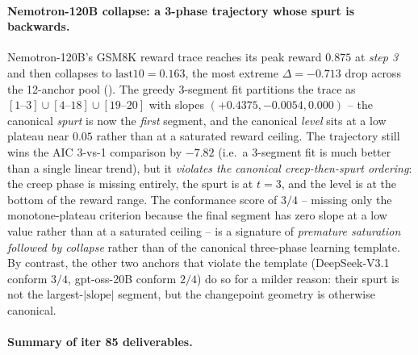 \paragraph{Nemotron-120B collapse: a 3-phase trajectory whose spurt is
backwards.}
\label{par:scaling-iter85-nemotron}
Nemotron-120B's GSM8K reward trace reaches its peak reward $0.875$ at
\emph{step 3} and then collapses to $\mathrm{last10} = 0.163$, the most
extreme $\Delta = -0.713$ drop across the 12-anchor pool
().  The greedy 3-segment fit partitions the
trace as $[1\text{--}3] \cup [4\text{--}18] \cup [19\text{--}20]$ with
slopes $(+0.4375, -0.0054, 0.000)$ -- the canonical \emph{spurt} is now
the \emph{first} segment, and the canonical \emph{level} sits at a low
plateau near $0.05$ rather than at a saturated reward ceiling.  The
trajectory still wins the AIC 3-vs-1 comparison by $-7.82$ (i.e.\ a
3-segment fit is much better than a single linear trend), but it
\emph{violates the canonical creep-then-spurt ordering}: the creep phase
is missing entirely, the spurt is at $t=3$, and the level is at the
bottom of the reward range.  The conformance score of $3/4$ -- missing
only the monotone-plateau criterion because the final segment has zero
slope at a low value rather than at a saturated ceiling -- is a
signature of \emph{premature saturation followed by collapse} rather
than of the canonical three-phase learning template.  By contrast, the
other two anchors that violate the template (DeepSeek-V3.1 conform
$3/4$, gpt-oss-20B conform $2/4$) do so for a milder reason: their
spurt is not the largest-$|\mathrm{slope}|$ segment, but the changepoint
geometry is otherwise canonical.

\paragraph{Summary of iter 85 deliverables.}
\label{par:scaling-iter85-deliverables}

